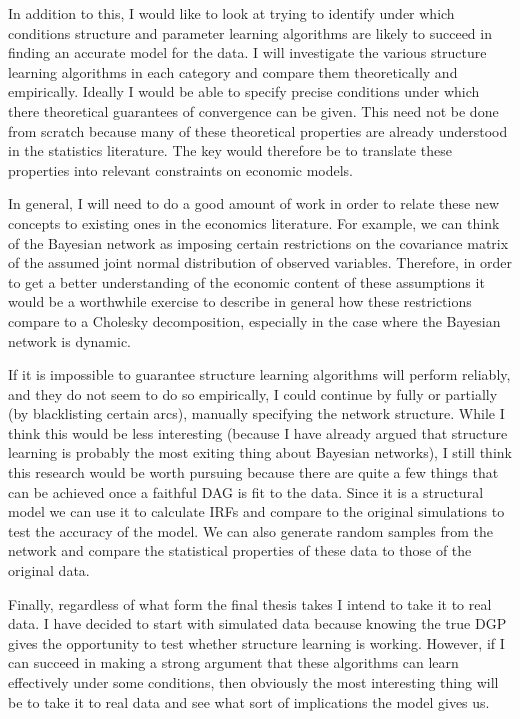 \documentclass{article}
\begin{document}
In addition to this, I would like to look at trying to identify under which conditions structure and parameter learning algorithms are likely to succeed in finding an accurate model for the data. I will investigate the various structure learning algorithms in each category and compare them theoretically and empirically. Ideally I would be able to specify precise conditions under which there theoretical guarantees of convergence can be given. This need not be done from scratch because many of these theoretical properties are already understood in the statistics literature. The key would therefore be to translate these properties into relevant constraints on economic models.

In general, I will need to do a good amount of work in order to relate these new concepts to existing ones in the economics literature. For example, we can think of the Bayesian network as imposing certain restrictions on the covariance matrix of the assumed joint normal distribution of observed variables. Therefore, in order to get a better understanding of the economic content of these assumptions it would be a worthwhile exercise to describe in general how these restrictions compare to a Cholesky decomposition, especially in the case where the Bayesian network is dynamic. 

If it is impossible to guarantee structure learning algorithms will perform reliably, and they do not seem to do so empirically, I could continue by fully or partially (by blacklisting certain arcs), manually specifying the network structure. While I think this would be less interesting (because I have already argued that structure learning is probably the most exiting thing about Bayesian networks), I still think this research would be worth pursuing because there are quite a few things that can be achieved once a faithful DAG is fit to the data. Since it is a structural model we can use it to calculate IRFs and compare to the original simulations to test the accuracy of the model. We can also generate random samples from the network and compare the statistical properties of these data to those of the original data.

Finally, regardless of what form the final thesis takes I intend to take it to real data. I have decided to start with simulated data because knowing the true DGP gives the opportunity to test whether structure learning is working. However, if I can succeed in making a strong argument that these algorithms can learn effectively under some conditions, then obviously the most interesting thing will be to take it to real data and see what sort of implications the model gives us.  

\printbibliography
\end{document}
